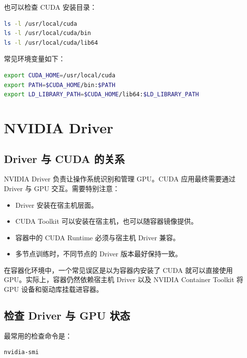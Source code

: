 也可以检查 CUDA 安装目录：

\begin{lstlisting}[language=bash,caption={检查 CUDA 安装目录},label={lst:check-cuda-path}]
ls -l /usr/local/cuda
ls -l /usr/local/cuda/bin
ls -l /usr/local/cuda/lib64
\end{lstlisting}

常见环境变量如下：

\begin{lstlisting}[language=bash,caption={CUDA 常见环境变量},label={lst:cuda-env-vars}]
export CUDA_HOME=/usr/local/cuda
export PATH=$CUDA_HOME/bin:$PATH
export LD_LIBRARY_PATH=$CUDA_HOME/lib64:$LD_LIBRARY_PATH
\end{lstlisting}

\section{NVIDIA Driver}

\subsection{Driver 与 CUDA 的关系}

NVIDIA Driver 负责让操作系统识别和管理 GPU。CUDA 应用最终需要通过 Driver 与 GPU 交互。需要特别注意：

\begin{itemize}
\item Driver 安装在宿主机层面。
\item CUDA Toolkit 可以安装在宿主机，也可以随容器镜像提供。
\item 容器中的 CUDA Runtime 必须与宿主机 Driver 兼容。
\item 多节点训练时，不同节点的 Driver 版本最好保持一致。
\end{itemize}

在容器化环境中，一个常见误区是以为容器内安装了 CUDA 就可以直接使用 GPU。实际上，容器仍然依赖宿主机 Driver 以及 NVIDIA Container Toolkit 将 GPU 设备和驱动库挂载进容器。

\subsection{检查 Driver 与 GPU 状态}

最常用的检查命令是：

\begin{lstlisting}[language=bash,caption={检查 NVIDIA Driver 与 GPU 状态},label={lst:nvidia-smi-basic}]
nvidia-smi
\end{lstlisting}

